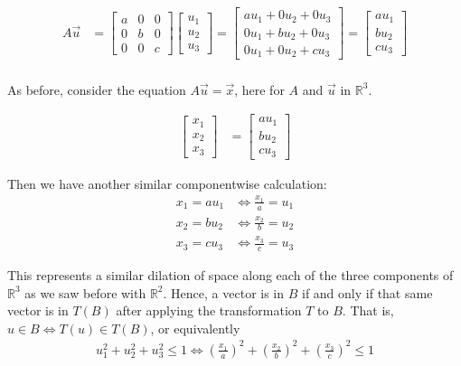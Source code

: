 \documentclass[10pt,letterpaper,final]{report}
\begin{document}
\begin{align*}
  A\vec{u} & = \begin{bmatrix}
                 a & 0 & 0 \\
                 0 & b & 0 \\
                 0 & 0 & c
               \end{bmatrix}\begin{bmatrix}u_1 \\ u_2\\u_3\end{bmatrix} = \begin{bmatrix}au_1 + 0u_2 + 0u_3\\0u_1 + bu_2 + 0u_3\\0u_1 + 0u_2 + cu_3\end{bmatrix} = \begin{bmatrix}au_1\\bu_2\\cu_3\end{bmatrix} \\
\end{align*}

As before, consider the equation $A\vec{u} = \vec{x}$, here for $A$ and $\vec{u}$ in $\mathbb{R}^3$.

\begin{align*}
  \begin{bmatrix}x_1\\x_2\\x_3\end{bmatrix} & = \begin{bmatrix}au_1\\bu_2\\cu_3\end{bmatrix}
\end{align*}

Then we have another similar componentwise calculation:
\begin{align*}
  x_1 = au_1 & \iff \frac{x_1}{a} = u_1 \\
  x_2 = bu_2 & \iff \frac{x_2}{b} = u_2 \\
  x_3 = cu_3 & \iff \frac{x_3}{c} = u_3
\end{align*}

This represents a similar dilation of space along each of the three components of $\mathbb{R}^3$ as we saw before with $\mathbb{R}^2$. Hence, a vector is in $B$ if and only if that same vector is in $T(B)$ after applying the transformation $T$ to $B$. That is, $u \in B \iff T(u) \in T(B)$, or equivalently
\begin{align*}
  u_1^2 + u_2^2 + u_3^2 \le 1 \iff \left(\frac{x_1}{a}\right)^2 + \left(\frac{x_2}{b}\right)^2 + \left(\frac{x_3}{c}\right)^2 \le 1
\end{align*}
\end{document}

